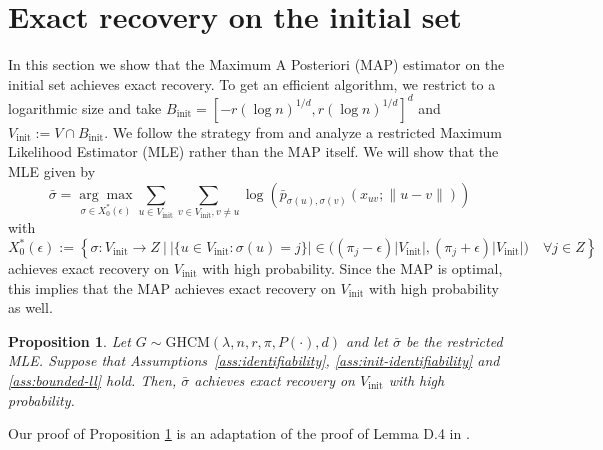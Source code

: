 \documentclass[11pt, a4paper]{amsart}
\newcommand{\1}{\mathbf{1}}
\newtheorem{proposition}[theorem]{Proposition}
\theoremstyle{definition}
\theoremstyle{remark}
\theoremstyle{definition}
\begin{document}
\section{Exact recovery on the initial set}
In this section we show that the Maximum A Posteriori (MAP) estimator on the initial set achieves exact recovery. To get an efficient algorithm, we restrict to a logarithmic size and take $B_{\mathrm{init}} = [-r (\log n)^{1/d},r (\log n)^{1/d}]^d$ and $V_{\mathrm{init}}:=V \cap B_{\mathrm{init}}$. We follow the strategy from \cite{gaudio2025incguan, gaudio2026jan} and analyze a restricted Maximum Likelihood Estimator (MLE) rather than the MAP itself. We will show that the MLE given by
\begin{equation}
    \bar{\sigma} = \underset{\sigma \in X^{*}_0(\epsilon)}{\arg \max }\sum_{u \in {V_{\mathrm{init}}}}\sum_{v \in {V_{\mathrm{init}}}, v\neq u} \log \left( \bar{p}_{\sigma(u),\sigma(v)}(x_{uv}; \|u-v\|)\right)
\end{equation}
with
\begin{equation}
\label{eq: restr mle}
    X^*_0(\epsilon) := \left\{ \sigma : {V_{\mathrm{init}}} \rightarrow {Z} \ \Big| \ | \{u \in {V_{\mathrm{init}}} : \sigma(u) = j \} | \in \big( (\pi_j - \epsilon)|V_{\mathrm{init}}|, (\pi_j + \epsilon)|V_{\mathrm{init}}| \big) \quad \forall j \in {Z}   \right\}
\end{equation}
achieves exact recovery on $V_{\mathrm{init}}$ with high probability. Since the MAP is optimal, this implies that the MAP achieves exact recovery on $V_{\mathrm{init}}$ with high probability as well. 


\begin{proposition}
\label{prop: initial ball}
Let ${G} \sim \mathrm{GHCM}( \lambda,n, r, \pi, P(\cdot), d)$ and let $\bar{\sigma}$ be the restricted MLE. Suppose that Assumptions~\ref{ass:identifiability}, \ref{ass:init-identifiability}  and \ref{ass:bounded-ll} hold. Then,
$\bar{\sigma}$  achieves exact recovery on $V_{\mathrm{init}}$ with high probability.
\end{proposition}

Our proof of Proposition \ref{prop: initial ball} is an adaptation of the proof of Lemma D.4 in \cite{gaudio2025incguan}. 
\end{document}
